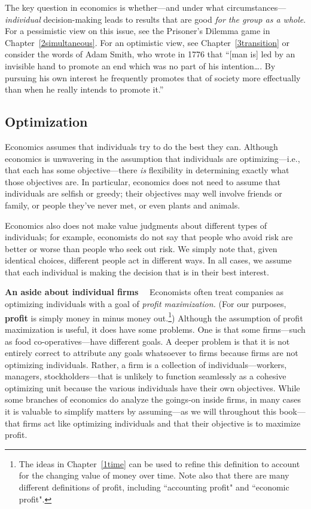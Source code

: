 The key question in economics is whether---and under what circumstances---\emph{individual} decision-making leads to results that are good \emph{for the group as a whole}. For a pessimistic view on this issue, see the Prisoner's Dilemma game in Chapter~\ref{2simultaneous}. For an optimistic view, see Chapter~\ref{3transition} or consider the words of Adam Smith, who wrote in 1776 that ``[man is] led by an invisible hand to promote an end which was no part of his intention\ldots. By pursuing his own interest he frequently promotes that of society more effectually than when he really intends to promote it.''


\subsection*{Optimization}

Economics assumes that individuals try to do the best they can. Although economics is unwavering in the assumption that individuals are optimizing---i.e., that each has some objective---there \emph{is} flexibility in determining exactly what those objectives are. In particular, economics does not need to assume that individuals are selfish or greedy; their objectives may well involve friends or family, or people they've never met, or even plants and animals.

Economics also does not make value judgments about different types of individuals; for example, economists do not say that people who avoid risk are better or worse than people who seek out risk. We simply note that, given identical choices, different people act in different ways. In all cases, we assume that each individual is making the decision that is in their best interest.

\smallskip

\noindent \textbf{An aside about individual firms} \ \ Economists often treat companies as optimizing individuals with a goal of \emph{profit maximization.} (For our purposes, \textbf{profit} is simply money in minus money out.\footnote{The ideas in Chapter~\ref{1time} can be used to refine this definition to account for the changing value of money over time. Note also that there are many different definitions of profit, including ``accounting profit" and ``economic profit".}) %
Although the assumption of profit maximization is useful, it does have some problems. One is that some firms---such as food co-operatives---have different goals. A deeper problem is that it is not entirely correct to attribute any goals whatsoever to firms because firms are not optimizing individuals. Rather, a firm is a collection of individuals---workers, managers, stockholders---that is unlikely to function seamlessly as a cohesive optimizing unit because the various individuals have their own objectives. While some branches of economics do analyze the goings-on inside firms, in many cases it is valuable to simplify matters by assuming---as we will throughout this book---that firms act like optimizing individuals and that their objective is to maximize profit.

